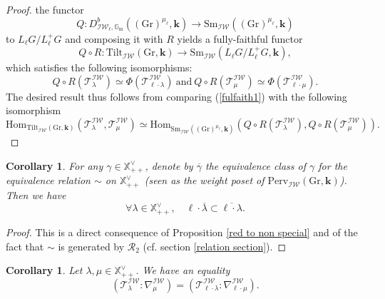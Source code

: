 \documentclass[11pt]{amsart}
\theoremstyle{plain}
\newtheorem{coro}[thm]{Corollary}
\theoremstyle{remark}
\numberwithin{equation}{section}
\begin{document}
\begin{proof}
	    the functor 
	    $$Q:D^b_{\mathcal{IW}_\ell,\mathbb{G}_\mathrm{m}}((\mathrm{Gr})^{\mu_\ell},\mathbf{k})\to \mathrm{Sm}_{\mathcal{IW}}((\mathrm{Gr})^{\mu_\ell},\mathbf{k})$$
	    to $L_\ell G/L^+_\ell G$ and composing it with $R$ yields a fully-faithful functor  $$Q\circ R:\mathrm{Tilt}_{\mathcal{IW}}(\mathrm{Gr},\mathbf{k})\to \mathrm{Sm}_{\mathcal{IW}}(L_\ell G/L^+_\ell G,\mathbf{k}), $$ which satisfies the following isomorphisms:
	    $$Q\circ R(\mathscr{T}^\mathcal{IW}_{\lambda})\simeq \Phi(\mathscr{T}^\mathcal{IW}_{\ell\cdot\lambda})~\text{and}~Q\circ R(\mathscr{T}^\mathcal{IW}_{\mu})\simeq \Phi(\mathscr{T}^\mathcal{IW}_{\ell\cdot\mu}).$$
	    The desired result thus follows from comparing (\ref{fulfaith1}) with the following isomorphism 
	    \begin{equation*}\label{fulfaith2}
	        \mathrm{Hom}_{\mathrm{Tilt}_\mathcal{IW}(\mathrm{Gr},\mathbf{k})}(\mathscr{T}^\mathcal{IW}_{\lambda},\mathscr{T}^\mathcal{IW}_{\mu})\simeq\mathrm{Hom}_{\mathrm{Sm}_{\mathcal{IW}}((\mathrm{Gr})^{\mu_\ell},\mathbf{k})}(Q\circ R(\mathscr{T}^\mathcal{IW}_{\lambda}),Q\circ R(\mathscr{T}^\mathcal{IW}_{\mu})). 
	    \end{equation*}
	\end{proof}
	\begin{coro}\label{inclusion classes}
	For any $\gamma\in\mathbb{X}^\vee_{++}$, denote by $\overline{\gamma}$ the equivalence class of $\gamma$ for the equivalence relation $\sim$ on $\mathbb{X}^\vee_{++}$ (seen as the weight poset of $\mathrm{Perv}_{\mathcal{IW}}(\mathrm{Gr},\mathbf{k})$). Then we have $$\forall \lambda\in \mathbb{X}^\vee_{++},\quad\ell\cdot\overline{\lambda}\subset\overline{\ell\cdot\lambda}.$$
	\end{coro}
	\begin{proof}
	 This is a direct consequence of Proposition \ref{red to non special} and of the fact that $\sim$ is generated by $\mathscr{R}_2$ (cf. section \ref{relation section}).
	\end{proof}
	\begin{coro}\label{red to non special2}
	Let $\lambda,\mu\in\mathbb{X}^\vee_{++}$. We have an equality 
	$$(\mathscr{T}^\mathcal{IW}_{\lambda}:\nabla^\mathcal{IW}_{\mu})=(\mathscr{T}^\mathcal{IW}_{\ell\cdot \lambda}:\nabla^\mathcal{IW}_{\ell\cdot\mu} ).$$
	\end{coro}
\end{document}
